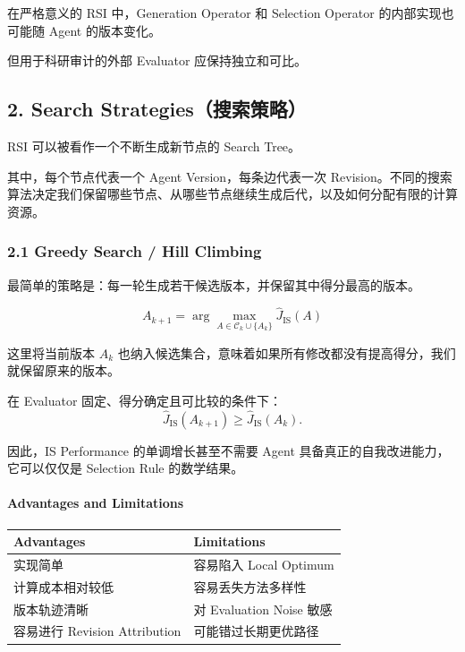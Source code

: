 在严格意义的 RSI 中，Generation Operator 和 Selection Operator 的内部实现也可能随 Agent 的版本变化。

但用于科研审计的外部 Evaluator 应保持独立和可比。

\hypertarget{part-3-40-0001-search-strategiesux641cux7d22ux7b56ux7565}{%
\subsection{2. Search Strategies（搜索策略）}\label{part-3-40-0001-search-strategiesux641cux7d22ux7b56ux7565}}

RSI 可以被看作一个不断生成新节点的 Search Tree。

其中，每个节点代表一个 Agent Version，每条边代表一次 Revision。不同的搜索算法决定我们保留哪些节点、从哪些节点继续生成后代，以及如何分配有限的计算资源。

\hypertarget{part-3-40-0001-greedy-search-hill-climbing}{%
\subsubsection{2.1 Greedy Search / Hill Climbing}\label{part-3-40-0001-greedy-search-hill-climbing}}

最简单的策略是：每一轮生成若干候选版本，并保留其中得分最高的版本。

\[\boxed{
A_{k+1}
=
\arg\max_{A\in\mathcal C_k\cup\{A_k\}}
\widehat J_{\mathrm{IS}}(A)
}\]

这里将当前版本 \(A_k\) 也纳入候选集合，意味着如果所有修改都没有提高得分，我们就保留原来的版本。

在 Evaluator 固定、得分确定且可比较的条件下：
\[\widehat J_{\mathrm{IS}}(A_{k+1})
\geq
\widehat J_{\mathrm{IS}}(A_k).\]

因此，IS Performance 的单调增长甚至不需要 Agent 具备真正的自我改进能力，它可以仅仅是 Selection Rule 的数学结果。

\hypertarget{part-3-40-0001-advantages-and-limitations}{%
\paragraph{Advantages and Limitations}\label{part-3-40-0001-advantages-and-limitations}}

\begin{readertable}
\begin{longtable}[]{@{}
  >{\raggedright\arraybackslash}p{}
  >{\raggedright\arraybackslash}p{}@{}}
\toprule
Advantages & Limitations \\
\midrule
\endhead
实现简单 & 容易陷入 Local Optimum \\
计算成本相对较低 & 容易丢失方法多样性 \\
版本轨迹清晰 & 对 Evaluation Noise 敏感 \\
容易进行 Revision Attribution & 可能错过长期更优路径 \\
\bottomrule
\end{longtable}
\end{readertable}


